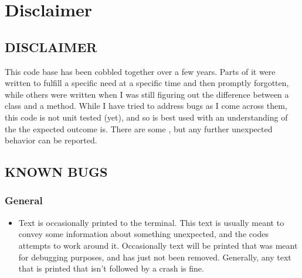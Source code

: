 \documentclass[letterpaper,10pt,english]{sphinxmanual}
\begin{document}
\section{Disclaimer}
\label{\detokenize{index:disclaimer}}

\subsection{DISCLAIMER}
\label{\detokenize{content/misc/DISCLAIMER:disclaimer}}\label{\detokenize{content/misc/DISCLAIMER::doc}}
This code base has been cobbled together over a few years. Parts of it were written to fulfill a specific need at a specific time and then promptly forgotten, while others were written when I was still figuring out the difference between a class and a method. While I have tried to address bugs as I come across them, this code is not unit tested (yet), and so is best used with an understanding of the the expected outcome is. There are some {\hyperref[\detokenize{content/misc/DISCLAIMER:known-bugs}]{}}, but any further unexpected behavior can be reported.


\subsection{KNOWN BUGS}
\label{\detokenize{content/misc/DISCLAIMER:known-bugs}}\label{\detokenize{content/misc/DISCLAIMER:id1}}

\subsubsection{General}
\label{\detokenize{content/misc/DISCLAIMER:general}}\begin{itemize}
\item {} 
Text is occasionally printed to the terminal. This text is usually meant to convey some information about something unexpected, and the codes attempts to work around it. Occasionally text will be printed that was meant for debugging purposes, and has just not been removed. Generally, any text that is printed that isn’t followed by a crash is fine.

\end{itemize}
\end{document}
